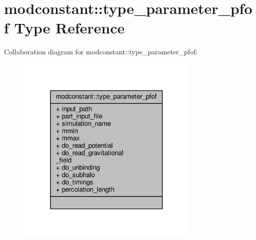 \hypertarget{structmodconstant_1_1type__parameter__pfof}{}\section{modconstant\+:\+:type\+\_\+parameter\+\_\+pfof Type Reference}
\label{structmodconstant_1_1type__parameter__pfof}


Collaboration diagram for modconstant\+:\+:type\+\_\+parameter\+\_\+pfof\+:\nopagebreak
\begin{figure}[H]
\begin{center}
\leavevmode
\includegraphics[width=248pt]{structmodconstant_1_1type__parameter__pfof__coll__graph}
\end{center}
\end{figure}
